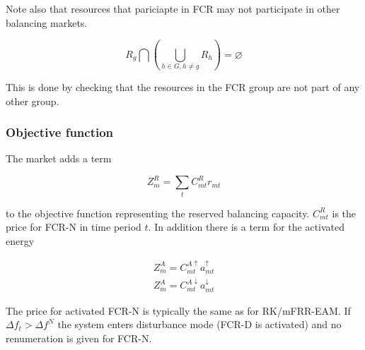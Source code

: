 \documentclass[]{report}
\newcommand{\aup}{a^{\uparrow}}
\newcommand{\adown}{a^{\downarrow}}
\newcommand{\cupa}{C^{A\uparrow}}
\newcommand{\cdowna}{C^{A\downarrow}}
\begin{document}

Note also that resources that pariciapte in FCR may not participate in other balancing markets. 

\begin{equation}
    R_g \bigcap \left( \bigcup_{h \in G, h \neq g} R_h \right) = \varnothing
\end{equation}

This is done by checking that the resources in the FCR group are not part of any other group.

\subsubsection{Objective function}
The market adds a term

\begin{equation}
    Z_m^R = \sum_t C^R_{mt} r_{mt}
\end{equation}

to the objective function representing the reserved balancing capacity. $C^R_{mt}$ is the price for FCR-N in time period $t$. In addition there is a term for the activated energy

\begin{align}
    Z_m^A = \cupa_{mt} \aup_{mt} \\
    Z_m^A = \cdowna_{mt} \adown_{mt}
\end{align}

The price for activated FCR-N is typically the same as for RK/mFRR-EAM. If $\Delta f_t > \Delta f^N$ the system enters disturbance mode (FCR-D is activated) and no renumeration is given for FCR-N. 
\end{document}
